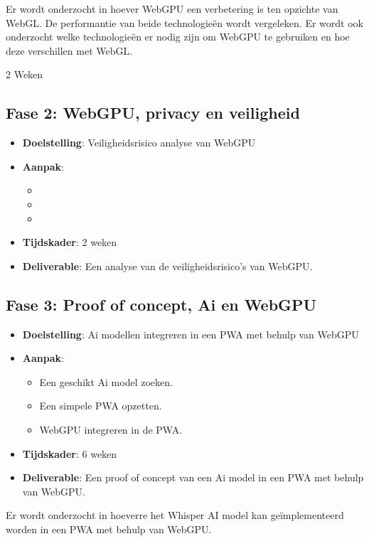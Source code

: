 Er wordt onderzocht in hoever WebGPU een verbetering is ten opzichte van WebGL. De performantie van beide technologieën wordt vergeleken. 
Er wordt ook onderzocht welke technologieën er nodig zijn om WebGPU te gebruiken en hoe deze verschillen met WebGL.

2 Weken

\subsection*{Fase 2: WebGPU, privacy en veiligheid}

\begin{itemize}
\item \textbf{Doelstelling}: Veiligheidsrisico analyse van WebGPU
\item \textbf{Aanpak}:
\begin{itemize}
\item 
\item 
\item 
\end{itemize}
\item \textbf{Tijdskader}: 2 weken
\item \textbf{Deliverable}: Een analyse van de veiligheidsrisico's van WebGPU.
\end{itemize}

\subsection*{Fase 3: Proof of concept, Ai en WebGPU}

\begin{itemize}
\item \textbf{Doelstelling}: Ai modellen integreren in een PWA met behulp van WebGPU
\item \textbf{Aanpak}:
\begin{itemize}
\item Een geschikt Ai model zoeken.
\item Een simpele PWA opzetten.
\item WebGPU integreren in de PWA.
\end{itemize}
\item \textbf{Tijdskader}: 6 weken
\item \textbf{Deliverable}: Een proof of concept van een Ai model in een PWA met behulp van WebGPU.
\end{itemize}
Er wordt onderzocht in hoeverre het Whisper AI model kan geïmplementeerd worden in een PWA met behulp van WebGPU.

